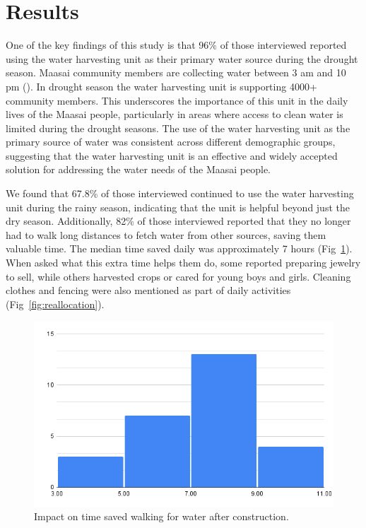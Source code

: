 \documentclass[10pt, twocolumn]{article}
\begin{document}
\section{Results}

One of the key findings of this study is that 96\% of those interviewed reported using the water harvesting unit as their primary water source during the drought season. Maasai community members are collecting water between 3 am and 10 pm (\autocite{Google}). In drought season the water harvesting unit is supporting 4000+ community members. This underscores the importance of this unit in the daily lives of the Maasai people, particularly in areas where access to clean water is limited during the drought seasons. The use of the water harvesting unit as the primary source of water was consistent across different demographic groups, suggesting that the water harvesting unit is an effective and widely accepted solution for addressing the water needs of the Maasai people.

We found that 67.8\% of those  interviewed continued to use the water harvesting unit during the rainy season, indicating that the unit is helpful beyond just the dry season. Additionally, 82\% of those interviewed reported that they no longer had to walk long distances to fetch water from other sources, saving them valuable time. The median time saved daily was approximately 7 hours (Fig~\ref{fig:time_saved}). When asked what this extra time helps them do, some reported preparing jewelry to sell, while others harvested crops or cared for young boys and girls. Cleaning clothes and fencing  were also mentioned as part of daily activities (Fig~\ref{fig:reallocation}).

\begin{figure}
    \centering
    \includegraphics[width=1\linewidth]{photos/time_saved.png}
    \caption{Impact on time saved walking for water after construction.}
    \label{fig:time_saved}
\end{figure}
\end{document}
